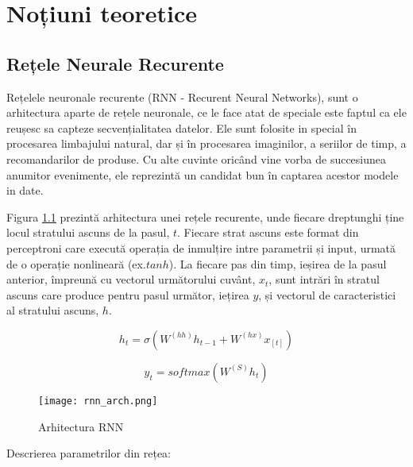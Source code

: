 \chapter{Noțiuni teoretice}

\section{Rețele Neurale Recurente}

Rețelele neuronale recurente (RNN - Recurent Neural Networks), sunt o arhitectura aparte de rețele neuronale, ce le face atat de speciale este faptul ca ele reușesc sa capteze secvențialitatea datelor. Ele sunt folosite in special în procesarea limbajului natural, dar și în procesarea imaginilor, a seriilor de timp, a recomandarilor de produse. Cu alte cuvinte oricând vine vorba de succesiunea anumitor evenimente, ele reprezintă un candidat bun în captarea acestor modele in date.

Figura \ref{fig:rnn_arch} prezintă arhitectura unei rețele recurente, unde fiecare dreptunghi ține locul stratului ascuns de la pasul, $t$. Fiecare strat ascuns este format din perceptroni care execută operația de inmulțire intre parametrii și input, urmată de o operație nonlineară (ex.$ tanh$). La fiecare pas din timp, ieșirea de la pasul anterior, împreună cu vectorul următorului cuvânt, $x_t$, sunt intrări în stratul ascuns care produce pentru pasul următor, iețirea $y$, și vectorul de caracteristici al stratului ascuns, $h$.


\begin{equation}
	h_t = \sigma{(W^{(hh)} h_{t-1} + W^{(hx)} x_{[t]})}
	\label{h_t}
\end{equation}

\begin{equation}
	y_t = softmax(W^{(S)} h_t) 
	\label{y_t}
\end{equation}

\begin{figure}[h]
	\centering
	\texttt{[image: rnn\_arch.png]}
	\caption{Arhitectura RNN \cite{cs224d_notes}}
	\label{fig:rnn_arch}
\end{figure}

Descrierea parametrilor din rețea:

